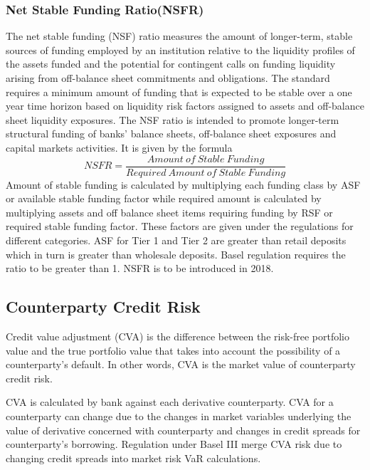 \documentclass[11pt]{article}
\numberwithin{equation}{section}
\begin{document}
\subsubsection{Net Stable Funding Ratio(NSFR)}
\medskip

The net stable funding (NSF) ratio measures the amount of longer-term, stable sources of funding employed by an institution relative to the liquidity profiles of the assets funded and the potential for contingent calls on funding liquidity arising from off-balance sheet commitments and obligations. The standard requires a minimum amount of funding that is expected to be stable over a one year time horizon based on liquidity risk factors assigned to assets and off-balance sheet liquidity exposures. The NSF ratio is intended to promote longer-term structural funding of banks’ balance sheets, off-balance sheet exposures and capital markets activities. It is given by the formula
\[ NSFR = \frac{Amount\: of\: Stable\: Funding}{Required\: Amount\: of\: Stable\: Funding}\]
Amount of stable funding is calculated by multiplying each funding class by ASF or available stable funding factor while required amount is calculated by multiplying assets and off balance sheet items requiring funding by RSF or required stable funding factor.  These factors are given under the regulations for different categories. ASF for Tier 1 and Tier 2 are greater than retail deposits which in turn is greater than wholesale deposits. Basel regulation requires the ratio to be greater than 1. NSFR is to be introduced in 2018.

\subsection{ Counterparty Credit Risk}
\medskip

 Credit value adjustment (CVA) is the difference between the risk-free portfolio value and the true portfolio value that takes into account the possibility of a counterparty's default. In other words, CVA is the market value of counterparty credit risk.
 
\hspace{1cm}CVA is calculated by bank against each derivative counterparty. CVA for a counterparty can change due to the changes in market variables underlying the value of derivative concerned with counterparty and changes in credit spreads for counterparty's borrowing. Regulation under Basel III merge CVA risk due to changing credit spreads into market risk VaR calculations.\\
\end{document}
